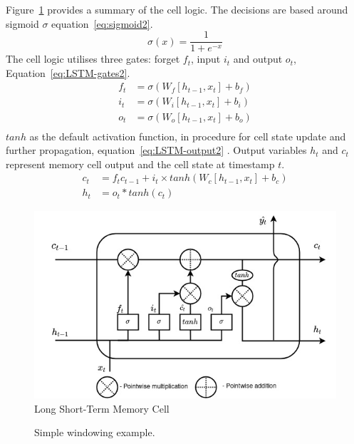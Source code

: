 {\mbox{Figure~\ref{fig:LSTM-cell2}} provides a summary of the cell logic.
The decisions are based around sigmoid $\sigma$ equation~\ref{eq:sigmoid2}.
\begin{equation}
    \sigma(x) = \frac{1}{1+e^{-x}}
    \label{eq:sigmoid2}
\end{equation}
The cell logic utilises three gates: forget $f_t$, input $i_t$ and output $o_t$, \mbox{Equation~\ref{eq:LSTM-gates2}}.
\begin{equation}
    \begin{split}
        f_t &= \sigma \left(W_f \left[h_{t-1}, x_t \right] + b_f \right) \\
        i_t &= \sigma \left(W_i \left[h_{t-1}, x_t \right] + b_i \right) \\
        o_t &= \sigma \left(W_o \left[h_{t-1}, x_t \right] + b_o \right) \\    
    \end{split}
    \label{eq:LSTM-gates2}
\end{equation}
$tanh$ as the default activation function, in procedure for cell state update and further propagation, \mbox{equation~\ref{eq:LSTM-output2}} .
Output variables $h_t$ and $c_t$ represent memory cell output and the cell state at timestamp $t$.
\begin{equation}
    \begin{split}
        c_t &= f_t c_{t-1}+i_t \times tanh \left(W_c \left[h_{t-1}, x_t \right] + b_c \right) \\
        h_t &= o_t*tanh \left(c_t \right)
    \end{split}
    \label{eq:LSTM-output2}
\end{equation}
\begin{figure}[htbp]
    \centering
    \includegraphics[width=\linewidth]{II_Body/LSTM/images/LSTM.jpg}
    \caption{Long Short-Term Memory Cell}
    \label{fig:LSTM-cell2}
\end{figure}
}
\begin{figure}[hbp]
    \centering
    
    \caption{Simple windowing example.}
    \label{fig:windowing_simple}
\end{figure}

